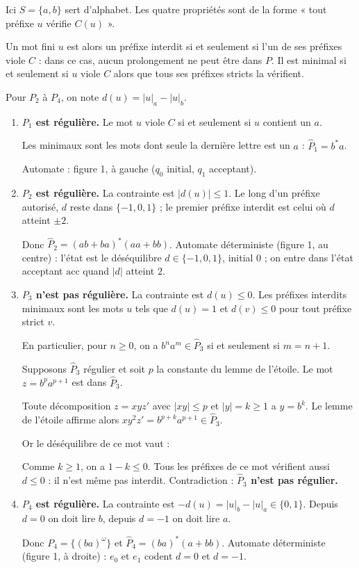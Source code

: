 \documentclass[11pt,a4paper]{article}
\newcommand{\equationajustee}[1]{%
  \sbox{\boiteequation}{$\displaystyle #1$}%
  \ifdim\wd\boiteequation>\linewidth
    \[\resizebox{\linewidth}{!}{\usebox{\boiteequation}}\]%
  \else
    \[#1\]%
  \fi}
\begin{document}
Ici \(S=\{a,b\}\) sert d'alphabet. Les quatre propriétés sont de la forme « tout préfixe \(u\) vérifie \(C(u)\) ».

Un mot fini \(u\) est alors un préfixe interdit si et seulement si l'un de ses préfixes viole \(C\) : dans ce cas, aucun prolongement ne peut être dans \(P\). Il est minimal si et seulement si \(u\) viole \(C\) alors que tous ses préfixes stricts la vérifient.

Pour \(P_2\) à \(P_4\), on note \(d(u)=|u|_a-|u|_b\).

\begin{enumerate}
\def\labelenumi{\arabic{enumi}.}
\item
  \textbf{\(P_1\) est régulière.} Le mot \(u\) viole \(C\) si et seulement si \(u\) contient un \(a\).

  Les minimaux sont les mots dont seule la dernière lettre est un \(a\) : \(\hat P_1=b^*a\).

  Automate : figure 1, à gauche (\(q_0\) initial, \(q_1\) acceptant).
\item
  \textbf{\(P_2\) est régulière.} La contrainte est \(|d(u)|\le1\). Le long d'un préfixe autorisé, \(d\) reste dans \(\{-1,0,1\}\) ; le premier préfixe interdit est celui où \(d\) atteint \(\pm2\).

  Donc \(\hat P_2=(ab+ba)^*(aa+bb)\). Automate déterministe (figure 1, au centre) : l'état est le déséquilibre \(d\in\{-1,0,1\}\), initial \(0\) ; on entre dans l'état acceptant \(\mathrm{acc}\) quand \(|d|\) atteint \(2\).
\item
  \textbf{\(P_3\) n'est pas régulière.} La contrainte est \(d(u)\le0\). Les préfixes interdits minimaux sont les mots \(u\) tels que \(d(u)=1\) et \(d(v)\le0\) pour tout préfixe strict \(v\).

  En particulier, pour \(n\ge0\), on a \(b^na^m\in\hat P_3\) si et seulement si \(m=n+1\).

  Supposons \(\hat P_3\) régulier et soit \(p\) la constante du lemme de l'étoile. Le mot \(z=b^pa^{p+1}\) est dans \(\hat P_3\).

  Toute décomposition \(z=xyz'\) avec \(|xy|\le p\) et \(|y|=k\ge1\) a \(y=b^k\). Le lemme de l'étoile affirme alors \(xy^2z'=b^{p+k}a^{p+1}\in\hat P_3\).

  Or le déséquilibre de ce mot vaut :

  \equationajustee{\begin{aligned}d(b^{p+k}a^{p+1})&=(p+1)-(p+k)\\&=1-k.\end{aligned}}

  Comme \(k\ge1\), on a \(1-k\le0\). Tous les préfixes de ce mot vérifient aussi \(d\le0\) : il n'est même pas interdit. Contradiction : \textbf{\(\hat P_3\) n'est pas régulier.}
\item
  \textbf{\(P_4\) est régulière.} La contrainte est \(-d(u)=|u|_b-|u|_a\in\{0,1\}\). Depuis \(d=0\) on doit lire \(b\), depuis \(d=-1\) on doit lire \(a\).

  Donc \(P_4=\{(ba)^\omega\}\) et \(\hat P_4=(ba)^*(a+bb)\). Automate déterministe (figure 1, à droite) : \(e_0\) et \(e_1\) codent \(d=0\) et \(d=-1\).
\end{enumerate}
\end{document}
